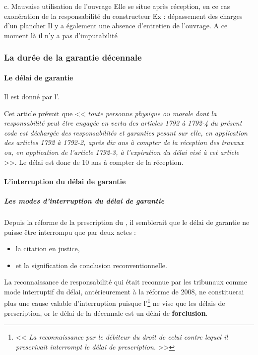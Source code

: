 		c.	Mauvaise utilisation de l’ouvrage
		Elle se situe après réception, en ce cas exonération de la responsabilité du constructeur
		Ex : dépassement des charges d’un plancher
		Il y a également une absence d’entretien de l’ouvrage. A ce moment là il n’y a pas d’imputabilité


		\subsubsection{La durée de la garantie décennale}

			\paragraph{Le délai de garantie} Il est donné par l'.

			Cet article prévoit que << {\itshape toute personne physique ou morale dont la responsabilité peut être engagée en vertu des articles 1792 à 1792-4 du présent code est déchargée des responsabilités et garanties pesant sur elle, en application des articles 1792 à 1792-2, après dix ans à compter de la réception des travaux ou, en application de l'article 1792-3, à l'expiration du délai visé à cet article} >>. Le délai est donc de 10 ans à compter de la réception.

			\paragraph{L'interruption du délai de garantie}

				\subparagraph{Les modes d'interruption du délai de garantie}

				Depuis la réforme de la prescription du , il semblerait que le délai de garantie ne puisse être interrompu que par deux actes :
				\begin{itemize}
					\item la citation en justice,
					\item et la signification de conclusion reconventionnelle.
				\end{itemize}

				La reconnaissance de responsabilité qui était reconnue par les tribunaux comme mode interruptif du délai, antérieurement à la réforme de 2008, ne constituerai plus une cause valable d'interruption puisque l'\footnote{<<  {\itshape La reconnaissance par le débiteur du droit de celui contre lequel il prescrivait interrompt le délai de prescription.} >>} ne vise que les délais de prescription, or le délai de la décennale est un délai de \textbf{forclusion}.

